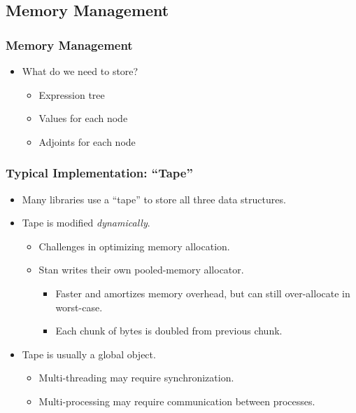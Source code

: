\subsection{Memory Management}
\frame{\tableofcontents[currentsubsection]}

\begin{frame}
\frametitle{Memory Management}
\begin{itemize}

\item{What do we need to store?}
    \begin{itemize}
        \item Expression tree
        \item Values for each node
        \item Adjoints for each node
    \end{itemize}

\end{itemize}
\end{frame}

\begin{frame}
\frametitle{Typical Implementation: ``Tape''}

\begin{itemize}
    
\item Many libraries use a ``tape'' to store all three data structures.
\item Tape is modified \emph{dynamically}.
    \begin{itemize}
        \item Challenges in optimizing memory allocation.
        \item Stan writes their own pooled-memory allocator.
            \begin{itemize}
                \item Faster and amortizes memory overhead, but can still over-allocate in worst-case.
                \item Each chunk of bytes is doubled from previous chunk.
            \end{itemize}
    \end{itemize}
\item Tape is usually a global object.
    \begin{itemize}
        \item Multi-threading may require synchronization.
        \item Multi-processing may require communication between processes.
    \end{itemize}

\end{itemize}
\end{frame}

